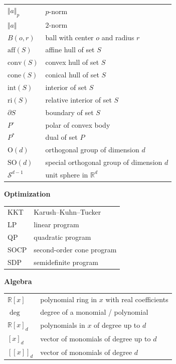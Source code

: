 \documentclass[
]{book}
\theoremstyle{definition}
\theoremstyle{definition}
\theoremstyle{definition}
\theoremstyle{definition}
\theoremstyle{remark}
\begin{document}
\begin{longtable}[]{@{}ll@{}}
\toprule()
\endhead
\(\Vert a \Vert_{p}\) & \(p\)-norm \\
\(\Vert a \Vert\) & \(2\)-norm \\
\(B(o,r)\) & ball with center \(o\) and radius \(r\) \\
\(\mathrm{aff}(S)\) & affine hull of set \(S\) \\
\(\mathrm{conv}(S)\) & convex hull of set \(S\) \\
\(\mathrm{cone}(S)\) & conical hull of set \(S\) \\
\(\mathrm{int}(S)\) & interior of set \(S\) \\
\(\mathrm{ri}(S)\) & relative interior of set \(S\) \\
\(\partial S\) & boundary of set \(S\) \\
\(P^\circ\) & polar of convex body \\
\(P^{*}\) & dual of set \(P\) \\
\(\mathrm{O}(d)\) & orthogonal group of dimension \(d\) \\
\(\mathrm{SO}(d)\) & special orthogonal group of dimension \(d\) \\
\(\mathcal{S}^{d-1}\) & unit sphere in \(\mathbb{R}^{d}\) \\
\bottomrule()
\end{longtable}

\textbf{Optimization}

\begin{longtable}[]{@{}ll@{}}
\toprule()
\endhead
KKT & Karush--Kuhn--Tucker \\
LP & linear program \\
QP & quadratic program \\
SOCP & second-order cone program \\
SDP & semidefinite program \\
\bottomrule()
\end{longtable}

\textbf{Algebra}

\begin{longtable}[]{@{}ll@{}}
\toprule()
\endhead
\(\mathbb{R}[x]\) & polynomial ring in \(x\) with real coefficients \\
\(\deg\) & degree of a monomial / polynomial \\
\(\mathbb{R}[x]_d\) & polynomials in \(x\) of degree up to \(d\) \\
\([x]_d\) & vector of monomials of degree up to \(d\) \\
\([\![x ]\!]_d\) & vector of monomials of degree \(d\) \\
\bottomrule()
\end{longtable}
\end{document}
